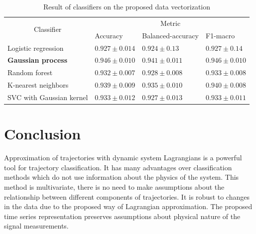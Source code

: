 \documentclass[12pt]{paper}
\begin{document}
\begin{table}[!htbp]
    \caption{Result of classifiers on the proposed data vectorization}
    \centering
    \begin{tabular}{|l|lll|}
    \hline
    \multicolumn{1}{|c|}{\multirow{2}{*}{Classifier}} & \multicolumn{3}{c|}{Metric}                                                                     	\\ \cline{2-4} 
    \multicolumn{1}{|c|}{}                               & \multicolumn{1}{l|}{Accuracy}         & \multicolumn{1}{l|}{Balanced-accuracy} & F1-macro        \\ \hline
    Logistic regression                              & \multicolumn{1}{l|}{$0.927 \pm  0.014$} & \multicolumn{1}{l|}{$0.924 \pm 0.13$}    & $0.927 \pm 0.14$  \\ \hline
    \textbf{Gaussian process}                                  & \multicolumn{1}{l|}{$\mathbf{0.946} \pm \mathbf{0.010}$}  & \multicolumn{1}{l|}{$\mathbf{0.941} \pm \mathbf{0.011}$}   & $\mathbf{0.946} \pm \mathbf{0.010}$ \\ \hline
    Random forest                                        & \multicolumn{1}{l|}{$0.932 \pm 0.007$}  & \multicolumn{1}{l|}{$0.928 \pm 0.008$}   & $0.933 \pm 0.008$ \\ \hline
    K-nearest neighbors                                  & \multicolumn{1}{l|}{$0.939 \pm 0.009$}  & \multicolumn{1}{l|}{$0.935 \pm 0.010$}   & $0.940 \pm 0.008$ \\ \hline
    SVC with Gaussian kernel                             & \multicolumn{1}{l|}{$0.933 \pm 0.012$}  & \multicolumn{1}{l|}{$0.927 \pm 0.01$3}   & $0.933 \pm 0.011$ \\ \hline
    \end{tabular}
    \label{table:classifictors}
\end{table}

\section{Conclusion}
Approximation of trajectories with dynamic system Lagrangians is a powerful tool for trajectory classification. It has many advantages over classification methods which do not use information about the physics of the system. This method is multivariate, there is no need to make  assumptions about the relationship between different components of trajectories. It is robust to changes in the data due to the proposed way of Lagrangian approximation. The proposed time series representation preserves assumptions about physical nature of the signal measurements.  
\end{document}
